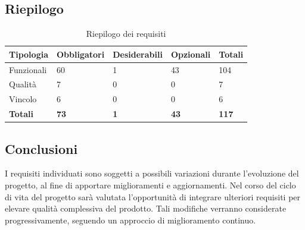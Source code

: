 ﻿\documentclass[a4paper,12pt]{article}
\begin{document}
{    \subsection{Riepilogo}{
        \begin{table}[H]
        \centering
            \begin{tabular}{|l|l|l|l|l|}
                \hline
                \rowcolor{gold}
                \textbf{Tipologia} & \textbf{Obbligatori} & \textbf{Desiderabili} & \textbf{Opzionali} & \textbf{Totali} \\
                \hline
                Funzionali & 60 & 1 & 43 & 104 \\
                \hline
                Qualità & 7 & 0 & 0 & 7 \\
                \hline
                Vincolo & 6 & 0 & 0 & 6 \\
                \hline
                \textbf{Totali} & \textbf{73} & \textbf{1} & \textbf{43} & \textbf{117} \\
                \hline
            \end{tabular}
            \caption{Riepilogo dei requisiti} 
            \label{tab:riepilogo-requisiti}
        \end{table}
    }

  \subsection{Conclusioni}{
      I requisiti individuati sono soggetti a possibili variazioni durante l'evoluzione del progetto, al fine di apportare miglioramenti e aggiornamenti. Nel corso del ciclo di vita del progetto sarà valutata l'opportunità di integrare ulteriori requisiti per elevare qualità complessiva del prodotto. Tali modifiche verranno considerate progressivamente, seguendo un approccio di miglioramento continuo.
  }
 }
\end{document}
